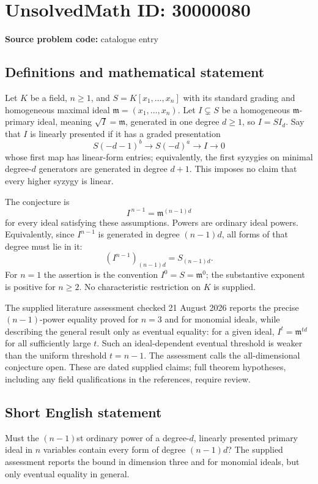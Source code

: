 \documentclass[11pt]{article}
\begin{document}
\section*{UnsolvedMath ID: 30000080}
\textbf{Source problem code:} catalogue entry
\subsection{Definitions and mathematical statement}
Let $K$ be a field, $n\geq1$, and $S=K[x_1,\ldots,x_n]$ with its standard grading and homogeneous maximal ideal $\mathfrak m=(x_1,\ldots,x_n)$. Let $I\subsetneq S$ be a homogeneous $\mathfrak m$-primary ideal, meaning $\sqrt I=\mathfrak m$, generated in one degree $d\geq1$, so $I=S I_d$. Say that $I$ is linearly presented if it has a graded presentation
\[
 S(-d-1)^b\longrightarrow S(-d)^a\longrightarrow I\longrightarrow0
\]
whose first map has linear-form entries; equivalently, the first syzygies on minimal degree-$d$ generators are generated in degree $d+1$. This imposes no claim that every higher syzygy is linear.

The conjecture is
\[
 I^{\,n-1}=\mathfrak m^{(n-1)d}
\]
for every ideal satisfying these assumptions. Powers are ordinary ideal powers. Equivalently, since $I^{n-1}$ is generated in degree $(n-1)d$, all forms of that degree must lie in it:
\[
 (I^{n-1})_{(n-1)d}=S_{(n-1)d}.
\]
For $n=1$ the assertion is the convention $I^0=S=\mathfrak m^0$; the substantive exponent is positive for $n\geq2$. No characteristic restriction on $K$ is supplied.

The supplied literature assessment checked 21 August 2026 reports the precise $(n-1)$-power equality proved for $n=3$ and for monomial ideals, while describing the general result only as eventual equality: for a given ideal, $I^t=\mathfrak m^{td}$ for all sufficiently large $t$. Such an ideal-dependent eventual threshold is weaker than the uniform threshold $t=n-1$. The assessment calls the all-dimensional conjecture open. These are dated supplied claims; full theorem hypotheses, including any field qualifications in the references, require review.
\subsection{Short English statement}
Must the $(n-1)$st ordinary power of a degree-$d$, linearly presented primary ideal in $n$ variables contain every form of degree $(n-1)d$? The supplied assessment reports the bound in dimension three and for monomial ideals, but only eventual equality in general.
\end{document}
